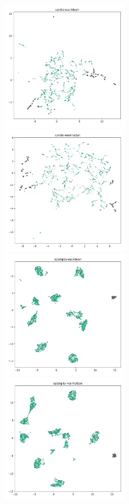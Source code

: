 \begin{figure}
   \centering
   \includegraphics[width=2.5in]{images/umaps/cardio-euclidean-umap2d.png}
   \includegraphics[width=2.5in]{images/umaps/cardio-manhattan-umap2d.png}
   \includegraphics[width=2.5in]{images/umaps/optdigits-euclidean-umap2d.png}
   \includegraphics[width=2.5in]{images/umaps/optdigits-manhattan-umap2d.png}

\end{figure}

